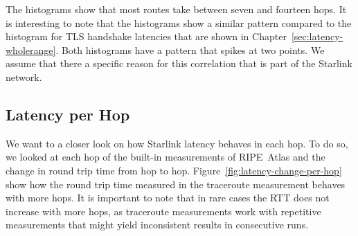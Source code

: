 The histograms show that most routes take between seven and fourteen hops.
It is interesting to note that the histograms show a similar pattern compared
to the histogram for TLS handshake latencies that are shown in
Chapter~\ref{sec:latency-wholerange}. Both histograms have a pattern that
spikes at two points. We assume that there a specific reason for this
correlation that is part of the Starlink network.

\subsection{Latency per Hop}

We want to a closer look on how Starlink latency behaves in each hop. To do so,
we looked at each hop of the built-in measurements of RIPE~Atlas and the change
in round trip time from hop to hop. Figure~\ref{fig:latency-change-per-hop}
show how the round trip time measured in the traceroute measurement behaves
with more hops. It is important to note that in rare cases the RTT does not
increase with more hops, as traceroute measurements work with repetitive
measurements that might yield inconsistent results in consecutive runs.

